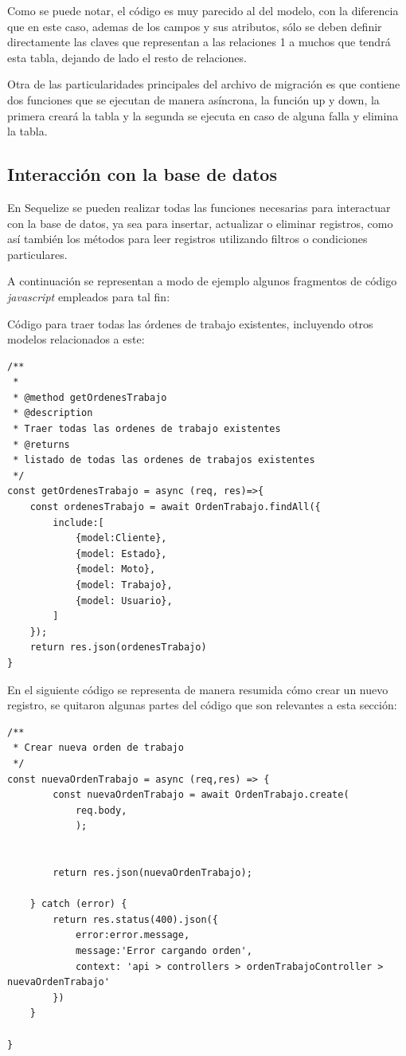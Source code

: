 Como se puede notar, el código es muy parecido al del modelo, con la diferencia que en este caso, ademas de los campos y sus atributos, sólo se deben definir directamente las claves que representan a las relaciones 1 a muchos que tendrá esta tabla, dejando de lado el resto de relaciones. 

Otra de las particularidades principales del archivo de migración es que contiene dos funciones que se ejecutan de manera asíncrona, la función up y down, la primera creará la tabla y la segunda se ejecuta en caso de alguna falla y elimina la tabla. 
  

\subsection{Interacción con la base de datos}
\label{subsec:interaccionbasededatos}

En Sequelize se pueden realizar todas las funciones necesarias para interactuar con la base de datos, ya sea para insertar, actualizar o eliminar registros, como así también los métodos para leer registros utilizando filtros o condiciones particulares.

A continuación se representan a modo de ejemplo algunos fragmentos de código \textit{javascript} empleados para tal fin:

Código para traer todas las órdenes de trabajo existentes, incluyendo otros modelos relacionados a este:

\begin{lstlisting}[caption= Código para traer datos en Sequelize.]
/**
 * 
 * @method getOrdenesTrabajo 
 * @description
 * Traer todas las ordenes de trabajo existentes
 * @returns
 * listado de todas las ordenes de trabajos existentes
 */
const getOrdenesTrabajo = async (req, res)=>{
    const ordenesTrabajo = await OrdenTrabajo.findAll({
        include:[
            {model:Cliente},
            {model: Estado},
            {model: Moto},
            {model: Trabajo},
            {model: Usuario},
        ]
    });
    return res.json(ordenesTrabajo)
}
\end{lstlisting}

En el siguiente código se representa de manera resumida cómo crear un nuevo registro, se quitaron algunas partes del código que son relevantes a esta sección:

\begin{lstlisting}[label=cod:nuevoregistro,caption=Código resumido para crear nuevo registro en la base de datos.]
/**
 * Crear nueva orden de trabajo
 */
const nuevaOrdenTrabajo = async (req,res) => {
        const nuevaOrdenTrabajo = await OrdenTrabajo.create(
            req.body, 
            );
  

        return res.json(nuevaOrdenTrabajo);
        
    } catch (error) {
        return res.status(400).json({
            error:error.message, 
            message:'Error cargando orden',
            context: 'api > controllers > ordenTrabajoController > nuevaOrdenTrabajo'
        })  
    }
    
}
\end{lstlisting}

